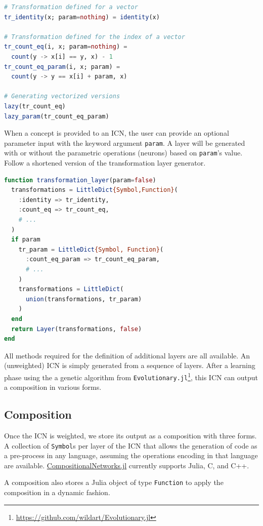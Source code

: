 \documentclass{juliacon}
\newcommand{\cnjl}{\href{https://github.com/JuliaConstraints/CompositionalNetworks.jl}{CompositionalNetworks.jl}\xspace}
\begin{document}
\begin{lstlisting}[language = Julia]
# Transformation defined for a vector
tr_identity(x; param=nothing) = identity(x)

# Transformation defined for the index of a vector
tr_count_eq(i, x; param=nothing) =
  count(y -> x[i] == y, x) - 1
tr_count_eq_param(i, x; param) =
  count(y -> y == x[i] + param, x)

# Generating vectorized versions
lazy(tr_count_eq)
lazy_param(tr_count_eq_param)
\end{lstlisting}

When a concept is provided to an ICN, the user can provide an optional parameter input with the keyword argument \texttt{param}. A layer will be generated with or without the parametric operations (neurons) based on \texttt{param}'s value. Follow a shortened version of the transformation layer generator.

\begin{lstlisting}[language = Julia]
function transformation_layer(param=false)
  transformations = LittleDict{Symbol,Function}(
    :identity => tr_identity,
    :count_eq => tr_count_eq,
    # ...
  )
  if param
    tr_param = LittleDict{Symbol, Function}(
      :count_eq_param => tr_count_eq_param,
      # ...
    )
    transformations = LittleDict(
      union(transformations, tr_param)
    )
  end
  return Layer(transformations, false)
end
\end{lstlisting}

All methods required for the definition of additional layers are all available. An (unweighted) ICN is simply generated from a sequence of layers. After a learning phase using the a genetic algorithm from \texttt{Evolutionary.jl}\footnote{\url{https://github.com/wildart/Evolutionary.jl}}, this ICN can output a composition in various forms.

\subsection{Composition}
\label{subsec:composition}

Once the ICN is weighted, we store its  output as a composition with three forms.
A collection of \texttt{Symbol}s per layer of the ICN that allows the generation of code as a pre-process in any language, assuming the operations encoding in that language are available. \cnjl currently supports Julia, C, and C++.

A composition also stores a Julia object of type \texttt{Function} to apply the composition in a dynamic fashion.
\end{document}
